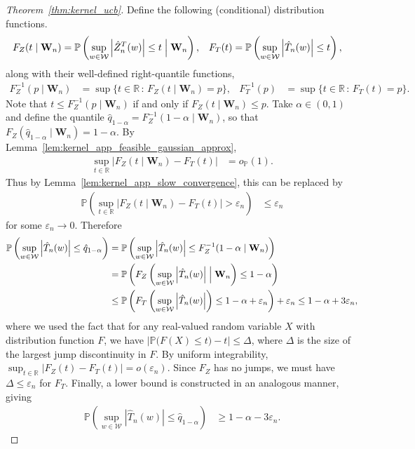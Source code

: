 \documentclass[11pt,lof]{puthesis}
\renewcommand{\P}{\ensuremath{\mathbb{P}}}
\newcommand{\R}{\ensuremath{\mathbb{R}}}
\newcommand{\bW}{\ensuremath{\mathbf{W}}}
\newcommand{\cW}{\ensuremath{\mathcal{W}}}
\theoremstyle{break}
\theoremstyle{proof}
\newtheorem{proof}{Proof}
\begin{document}
\begin{proof}[Theorem~\ref{thm:kernel_ucb}]
Define the following (conditional) distribution functions.
%
\begin{align*}
F_Z(t \mid \bW_n)
&=
\P\left(
\sup_{w \in \cW}
\left| \hat Z_n^T(w) \right|
\leq t
\Bigm\vert \bW_n
\right),
&F_T(t)
&=
\P\left(
\sup_{w \in \cW}
\left| \hat T_n(w) \right|
\leq t
\right),
\end{align*}
%
along with their well-defined right-quantile functions,
%
\begin{align*}
F_Z^{-1}(p \mid \bW_n)
&=
\sup
\big\{
t \in \R
\, : \,
F_Z(t \mid \bW_n)
= p
\big\},
&F_T^{-1}(p)
&=
\sup
\big\{
t \in \R
\, : \,
F_T(t)
= p
\big\}.
\end{align*}
%
Note that
$t \leq F_Z^{-1}(p \mid \bW_n)$
if and only if
$F_Z(t \mid \bW_n) \leq p$.
Take $\alpha \in (0,1)$ and
define the quantile
$\hat q_{1-\alpha} = F_Z^{-1}(1-\alpha \mid \bW_n)$,
so that
$F_Z(\hat q_{1-\alpha} \mid \bW_n) = 1-\alpha$.
By Lemma~\ref{lem:kernel_app_feasible_gaussian_approx},
%
\begin{align*}
\sup_{t \in \R}
\big|
F_Z(t \mid \bW_n) - F_T(t)
\big|
&=
o_\P(1).
\end{align*}
%
Thus by Lemma~\ref{lem:kernel_app_slow_convergence},
this can be replaced by
%
\begin{align*}
\P\left(
\sup_{t \in \R} \big| F_Z(t \mid \bW_n) - F_T(t) \big|
> \varepsilon_n
\right)
&\leq \varepsilon_n
\end{align*}
%
for some $\varepsilon_n \to 0$.
Therefore
%
\begin{align*}
\P\left(
\sup_{w \in \cW}
\left|
\hat T_n(w)
\right|
\leq
\hat q_{1-\alpha}
\right)
&=
\P\left(
\sup_{w \in \cW}
\left|
\hat T_n(w)
\right|
\leq
F_Z^{-1}(1-\alpha \mid \bW_n)
\right) \\
&=
\P\left(
F_Z\left(
\sup_{w \in \cW}
\left|
\hat T_n(w)
\right|
\Bigm\vert \bW_n
\right)
\leq
1 - \alpha
\right) \\
&\leq
\P\left(
F_T\left(
\sup_{w \in \cW}
\left|
\hat T_n(w)
\right|
\right)
\leq
1 - \alpha + \varepsilon_n
\right)
+ \varepsilon_n
\leq 1 - \alpha + 3\varepsilon_n,
\end{align*}
%
where we used the fact that for any
real-valued random variable $X$ with distribution function $F$,
we have
$\big|\P\big(F(X) \leq t\big) - t\big| \leq \Delta$,
where $\Delta$ is the size of the
largest jump discontinuity in $F$.
By uniform integrability,
$\sup_{t \in \R} \big| F_Z(t) - F_T(t) \big| = o(\varepsilon_n)$.
Since $F_Z$ has no jumps,
we must have $\Delta \leq \varepsilon_n$ for $F_T$.
Finally, a lower bound is constructed in an analogous manner,
giving
%
\begin{align*}
\P\left(
\sup_{w \in \cW}
\left| \hat T_n(w) \right|
\leq
\hat q_{1-\alpha}
\right)
&\geq
1 - \alpha - 3\varepsilon_n.
\end{align*}
%
\end{proof}
\end{document}
